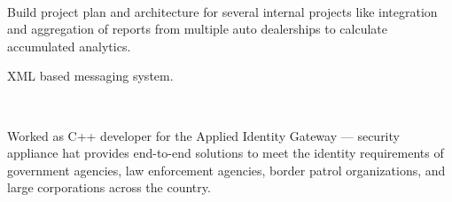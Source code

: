 \documentclass[]{hieudo-build}
\begin{document}
\begin{minipage}[t]{0.65\textwidth}
 \\
\begin{tightemize}
\item Build project plan and architecture for several internal projects like integration and aggregation of reports from multiple auto dealerships to calculate accumulated analytics. 
\item XML based messaging system.
\end{tightemize}
\sectionsep{}

 \\
\begin{tightemize}
\item Worked as C++ developer for the Applied Identity Gateway --- security appliance hat provides end-to-end solutions to meet the identity requirements of government agencies, law enforcement agencies, border patrol organizations, and large corporations across the country.
\end{tightemize}
\sectionsep{}




\end{minipage}
\end{document}
